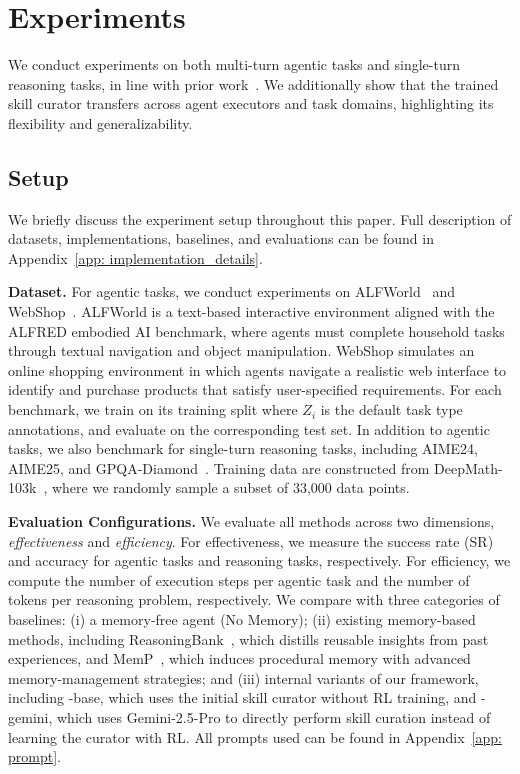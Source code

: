 \section{Experiments}

We conduct experiments on both multi-turn agentic tasks and single-turn reasoning tasks, in line with prior work~\citep{xia2026skillrl, wei2025evo, DBLP:journals/corr/abs-2602-10652}. We additionally show that the trained skill curator transfers across agent executors and task domains, highlighting its flexibility and generalizability.



\subsection{Setup}
We briefly discuss the experiment setup throughout this paper. Full description of datasets, implementations, baselines, and evaluations can be found in Appendix~\ref{app: implementation_details}.

\noindent\textbf{Dataset.} For agentic tasks, we conduct experiments on ALFWorld~\citep{shridhar2021alfworld} and WebShop~\citep{10.5555/3600270.3601778}. ALFWorld is a text-based interactive environment aligned with the ALFRED embodied AI benchmark, where agents must complete household tasks through textual navigation and object manipulation. WebShop simulates an online shopping environment in which agents navigate a realistic web interface to identify and purchase products that satisfy user-specified requirements. For each benchmark, we train \ours{} on its training split where $Z_i$ is the default task type annotations, and evaluate on the corresponding test set. In addition to agentic tasks, we also benchmark for single-turn reasoning tasks, including AIME24, AIME25, and GPQA-Diamond~\citep{rein2024gpqa}. Training data are constructed from DeepMath-103k~\citep{he2026deepmathk}, where we randomly sample a subset of 33,000 data points. 

\noindent\textbf{Evaluation Configurations.} 
We evaluate all methods across two dimensions, \textit{effectiveness} and \textit{efficiency}. For effectiveness, we measure the success rate (SR) and accuracy for agentic tasks and reasoning tasks, respectively. For efficiency, we compute the number of execution steps per agentic task and the number of tokens per reasoning problem, respectively. We compare \ours{} with three categories of baselines: 
(i) a memory-free agent (No Memory); 
(ii) existing memory-based methods, including ReasoningBank~\citep{ouyang2026reasoningbank}, which distills reusable insights from past experiences, and MemP~\citep{DBLP:journals/corr/abs-2508-06433}, which induces procedural memory with advanced memory-management strategies; and 
(iii) internal variants of our framework, including \ours{}-base, which uses the initial skill curator without RL training, and \ours{}-gemini, which uses Gemini-2.5-Pro to directly perform skill curation instead of learning the curator with RL. All prompts used can be found in Appendix~\ref{app: prompt}.

